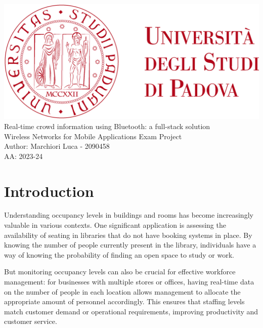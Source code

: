 \documentclass[a4paper, 11pt]{article}
\begin{document}
\begin{titlepage}
	\begin{center}
		\includegraphics[scale=0.1]{images/unipd_logo.png}\\		
		\vspace{4\baselineskip}
		\Huge Real-time crowd information using Bluetooth: a full-stack solution\\
        \vspace{4\baselineskip}
		\Large Wireless Networks for Mobile Applications Exam Project\\
		\vfill
		Author: Marchiori Luca - 2090458\\
		AA: 2023-24\\

	\end{center}
\end{titlepage}


\tableofcontents

\newpage
\section{Introduction}
Understanding occupancy levels in buildings and rooms has become increasingly valuable in various contexts. One significant application is assessing the availability of seating in libraries that do not have booking systems in place. By knowing the number of people currently present in the library, individuals have a way of knowing the probability of finding an open space to study or work. 

But monitoring occupancy levels can also be crucial for effective workforce management: for businesses with multiple stores or offices, having real-time data on the number of people in each location allows management to allocate the appropriate amount of personnel accordingly. This ensures that staffing levels match customer demand or operational requirements, improving productivity and customer service.
\end{document}
